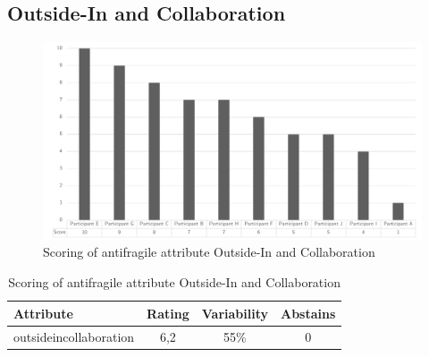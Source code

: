 \subsection{Outside-In and Collaboration}
\begin{figure}[H]
	\centering
	\includegraphics[width=0.9\linewidth]{images/scoreafnaarbuitenkijken}
	\caption[Scoring of antifragile attribute Outside-In and Collaboration]{Scoring of antifragile attribute Outside-In and Collaboration}
	\label{fig:appscoringafnaarbuiten}
\end{figure}
\begin{table}[H]
	\centering
	\begin{tabular}{p{}ccc}
		\toprule
		\textbf{Attribute} & \textbf{Rating} & \textbf{Variability} & \textbf{Abstains} \\
		\midrule
		\Gls{outsideincollaboration} & 6,2 & 55\% & 0 \\%
		\bottomrule
	\end{tabular}%
	\caption[Scoring of antifragile attribute Outside-In and Collaboration]{Scoring of antifragile attribute Outside-In and Collaboration}
	\label{tab:appscoringafnaarbuitenkijken}%
\end{table}%
\newpage
